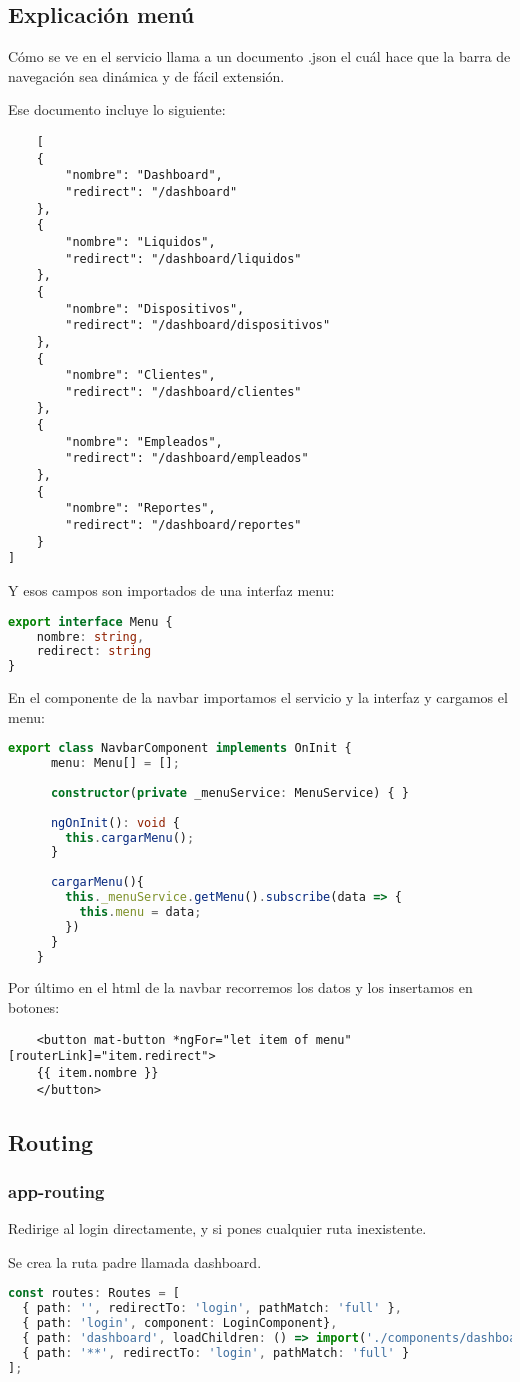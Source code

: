 \documentclass[a4paper]{article} %
\begin{document}
\subsection{Explicación menú}
Cómo se ve en el servicio llama a un documento .json el cuál hace que la barra de navegación
sea dinámica y de fácil extensión.\par\vspace{0.3cm}
Ese documento incluye lo siguiente:
\begin{lstlisting}
	[
    {
        "nombre": "Dashboard",
        "redirect": "/dashboard"
    },
    {
        "nombre": "Liquidos",
        "redirect": "/dashboard/liquidos"
    },
    {
        "nombre": "Dispositivos",
        "redirect": "/dashboard/dispositivos"
    },
    {
        "nombre": "Clientes",
        "redirect": "/dashboard/clientes"
    },
    {
        "nombre": "Empleados",
        "redirect": "/dashboard/empleados"
    },
    {
        "nombre": "Reportes",
        "redirect": "/dashboard/reportes"
    }
]
\end{lstlisting}
Y esos campos son importados de una interfaz menu:
\begin{lstlisting}[language=Typescript]
	export interface Menu {
    nombre: string,
    redirect: string
}
\end{lstlisting}
En el componente de la navbar importamos el servicio y la interfaz y cargamos el menu:
\begin{lstlisting}[language=Typescript]
	export class NavbarComponent implements OnInit {
	  menu: Menu[] = [];
	
	  constructor(private _menuService: MenuService) { }
	
	  ngOnInit(): void {
		this.cargarMenu();
	  }
	
	  cargarMenu(){
		this._menuService.getMenu().subscribe(data => {
		  this.menu = data;
		})
	  }
	}
\end{lstlisting}
Por último en el html de la navbar recorremos los datos y los insertamos en botones:
\begin{lstlisting}
	<button mat-button *ngFor="let item of menu" [routerLink]="item.redirect">
	{{ item.nombre }}
	</button>
\end{lstlisting}\clearpage
\subsection{Routing}
\subsubsection{app-routing}
Redirige al login directamente, y si pones cualquier ruta inexistente.\par\vspace{0.3cm}
Se crea la ruta padre llamada dashboard.
\begin{lstlisting}[language=Typescript]
	const routes: Routes = [
  { path: '', redirectTo: 'login', pathMatch: 'full' },
  { path: 'login', component: LoginComponent},
  { path: 'dashboard', loadChildren: () => import('./components/dashboard/dashboard.module').then(x => x.DashboardModule) },
  { path: '**', redirectTo: 'login', pathMatch: 'full' }
];
\end{lstlisting}
\end{document}
